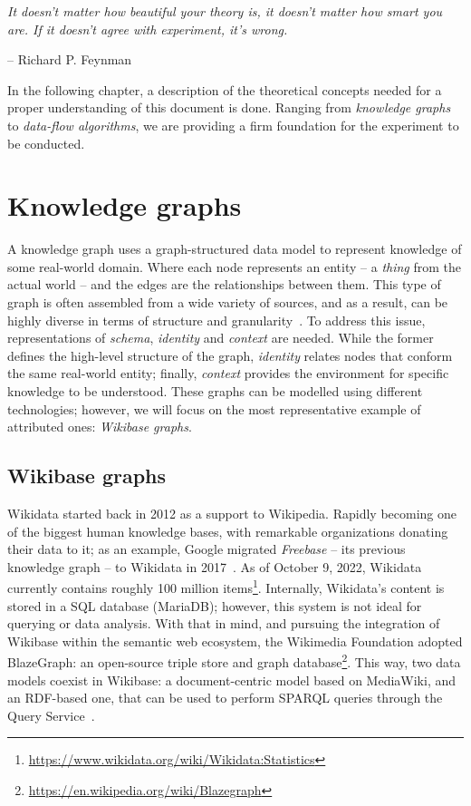 \epigraph{\textit{It doesn't matter how beautiful your theory is, it doesn't matter how smart you are. If it doesn't agree with experiment, it's wrong.}}{-- \textup{Richard P. Feynman }}

In the following chapter, a description of the theoretical concepts needed for a proper understanding of this document is done. Ranging from \textit{knowledge graphs} to \textit{data-flow algorithms}, we are providing a firm foundation for the experiment to be conducted.

\section{Knowledge graphs}
\label{section:knowledgeGraph}

A knowledge graph uses a graph-structured data model to represent knowledge of some real-world domain. Where each node represents an entity -- a \textit{thing} from the actual world -- and the edges are the relationships between them. This type of graph is often assembled from a wide variety of sources, and as a result, can be highly diverse in terms of structure and granularity~\cite{DBLP:journals/corr/abs-2003-02320}. To address this issue, representations of \textit{schema}, \textit{identity} and \textit{context} are needed. While the former defines the high-level structure of the graph, \textit{identity} relates nodes that conform the same real-world entity; finally, \textit{context} provides the environment for specific knowledge to be understood. These graphs can be modelled using different technologies; however, we will focus on the most representative example of attributed ones: \textit{Wikibase graphs}.

\subsection{Wikibase graphs}

Wikidata started back in 2012 as a support to Wikipedia. Rapidly becoming one of the biggest human knowledge bases, with remarkable organizations donating their data to it; as an example, Google migrated \textit{Freebase} -- its previous knowledge graph -- to Wikidata in 2017~\cite{10.1145/2872427.2874809}. As of October 9, 2022, Wikidata currently contains roughly 100 million items\footnote{\url{https://www.wikidata.org/wiki/Wikidata:Statistics}}. Internally, Wikidata's content is stored in a SQL database (MariaDB); however, this system is not ideal for querying or data analysis. With that in mind, and pursuing the integration of Wikibase within the semantic web ecosystem, the Wikimedia Foundation adopted BlazeGraph: an open-source triple store and graph database\footnote{\url{https://en.wikipedia.org/wiki/Blazegraph}}. This way, two data models coexist in Wikibase: a document-centric model based on MediaWiki, and an RDF-based one, that can be used to perform SPARQL queries through the Query Service~\cite{https://doi.org/10.48550/arxiv.2110.11709}.

